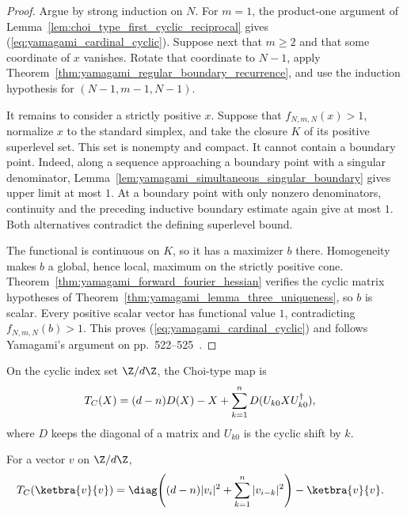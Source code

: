 \begin{proof}
    \leanok
    Argue by strong induction on $N$. For $m=1$, the product-one argument of
    Lemma~\ref{lem:choi_type_first_cyclic_reciprocal} gives
    (\ref{eq:yamagami_cardinal_cyclic}). Suppose next that $m\ge2$ and that
    some coordinate of $x$ vanishes. Rotate that coordinate to $N-1$, apply
    Theorem~\ref{thm:yamagami_regular_boundary_recurrence}, and use the
    induction hypothesis for $(N-1,m-1,N-1)$.

    It remains to consider a strictly positive $x$. Suppose that
    $f_{N,m,N}(x)>1$, normalize $x$ to the standard simplex, and take the
    closure $K$ of its positive superlevel set. This set is nonempty and
    compact. It cannot contain a boundary point. Indeed, along a sequence
    approaching a boundary point with a singular denominator,
    Lemma~\ref{lem:yamagami_simultaneous_singular_boundary} gives upper limit
    at most $1$. At a boundary point with only nonzero denominators,
    continuity and the preceding inductive boundary estimate again give at
    most $1$. Both alternatives contradict the defining superlevel bound.

    The functional is continuous on $K$, so it has a maximizer $b$ there.
    Homogeneity makes $b$ a global, hence local, maximum on the strictly
    positive cone. Theorem~\ref{thm:yamagami_forward_fourier_hessian} verifies
    the cyclic matrix hypotheses of
    Theorem~\ref{thm:yamagami_lemma_three_uniqueness}, so $b$ is scalar.
    Every positive scalar vector has functional value $1$, contradicting
    $f_{N,m,N}(b)>1$. This proves
    (\ref{eq:yamagami_cardinal_cyclic}) and follows Yamagami's argument on
    pp.~522--525~\cite{Yamagami1993Cyclic}.
\end{proof}

\begin{definition}
    \label{def:choi_type_map}
    \leanok
    On the cyclic index set $\Z/d\Z$, the Choi-type map is
    \begin{align}
        T_C(X)
         & =(d-n)D(X)-X+\sum_{k=1}^nD(U_{k0}XU_{k0}^{\dagger}),
        \notag
    \end{align}
    where $D$ keeps the diagonal of a matrix and $U_{k0}$ is the cyclic shift by
    $k$.
\end{definition}

\begin{lemma}
    \label{lem:choi_type_map_rankone}
    \leanok
    For a vector $v$ on $\Z/d\Z$,
    \begin{align}
        T_C(\ketbra{v}{v})
         & =
        \diag\!\left((d-n)|v_i|^2+\sum_{k=1}^n |v_{i-k}|^2\right)
        -\ketbra{v}{v}.
        \notag
    \end{align}
\end{lemma}

